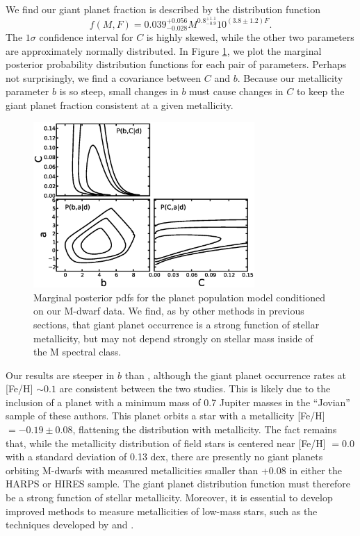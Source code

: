 We find our giant planet fraction is described by the distribution function
\begin{equation}
f(M,F) = 0.039^{+0.056}_{-0.028} M^{0.8^{+1.1}_{-0.9}} 10^{(3.8 \pm 1.2)F}.
\end{equation}
The $1\sigma$ confidence interval for $C$ is highly skewed, while the other two parameters are approximately normally distributed. In Figure \ref{Covar}, we plot the marginal posterior probability distribution functions for each pair of parameters. Perhaps not surprisingly, we find a covariance between $C$ and $b$. Because our metallicity parameter $b$ is so steep, small changes in $b$ must cause changes in $C$ to keep the giant planet fraction consistent at a given metallicity.

\begin{figure}[htbp]
\centerline{\includegraphics[width=0.75\textwidth]{chapter3/f12.eps}}
\caption[Marginal posterior distributions for the planet population model as a function of allowed power-law parameters]{Marginal posterior pdfs for the planet population model conditioned on our M-dwarf data. We find, as by other methods in previous sections, that giant planet occurrence is a strong function of stellar metallicity, but may not depend strongly on stellar mass inside of the M spectral class. 
  }
\label{Covar}
\end{figure}

Our results are steeper in $b$ than \citet{Neves13}, although the giant planet occurrence rates at [Fe/H] $\sim 0.1$ are consistent between the two studies. This is likely due to the inclusion of a planet with a minimum mass of 0.7 Jupiter masses in the ``Jovian'' sample of these authors. This planet orbits a star with a metallicity [Fe/H] $= -0.19 \pm 0.08$, flattening the distribution with metallicity. The fact remains that, while the metallicity distribution of field stars is centered near [Fe/H] $=0.0$ with a standard deviation of 0.13 dex, there are presently no giant planets orbiting M-dwarfs with measured metallicities smaller than +0.08 in either the HARPS or HIRES sample. The giant planet distribution function must therefore be a strong function of stellar metallicity. Moreover, it is essential to develop improved methods to measure metallicities of low-mass stars, such as the techniques developed by \citet{RojasAyala12} and \citet{Mann13a}.


